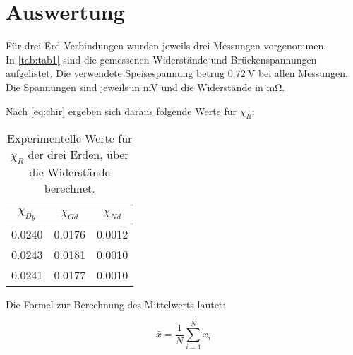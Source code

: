 \section{Auswertung}
\label{sec:Auswertung}

Für drei Erd-Verbindungen wurden jeweils drei Messungen vorgenommen.\\
In \autoref{tab:tab1} sind die gemessenen Widerstände und Brückenspannungen aufgelistet.
Die verwendete Speisespannung betrug $\SI{0.72}{\volt}$ bei allen Messungen.
Die Spannungen sind jeweils in \si{\milli\volt} und die Widerstände in \si{\milli\ohm}.

\begin{table}
  \centering
  \caption{Messdaten der drei seltenen Erden.}
  \label{tab:tab1}
\end{table}

Nach \autoref{eq:chir} ergeben sich daraus folgende Werte für $\chi_R$:
\begin{table}
  \centering
  \caption{Experimentelle Werte für $\chi_R$ der drei Erden, über die Widerstände berechnet.}
  \label{tab:tab2}
  \begin{tabular}{c|c|c}
    $\chi_{Dy}$ & $\chi_{Gd}$ & $\chi_{Nd}$\\
    \midrule
    0.0240 & 0.0176 & 0.0012\\
    0.0243 & 0.0181 & 0.0010\\
    0.0241 & 0.0177 & 0.0010\\
  \end{tabular}
\end{table}

Die Formel zur Berechnung des Mittelwerts lautet:

\begin{equation}
    \bar{x} = \frac{1}{N} \sum_{i=1}^N x_i
\end{equation}

